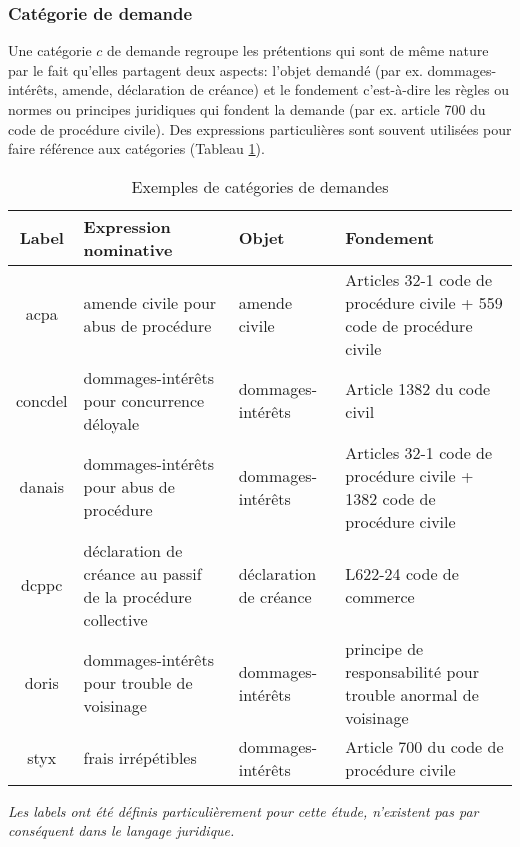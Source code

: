 \subsubsection{Catégorie de demande}

Une catégorie $c$ de demande regroupe les prétentions qui sont de même nature par le fait qu'elles partagent deux aspects: l'objet demandé (par ex. dommages-intérêts, amende, déclaration de créance) et le fondement c'est-à-dire les règles ou normes ou principes juridiques qui fondent la demande (par ex. article 700 du code de procédure civile). Des expressions particulières sont souvent utilisées pour faire référence aux catégories (Tableau \ref{tab:quanta:exemple-categorie}).

\begin{table}[h!]
\scriptsize
\begin{tabular}{|c|p{}|p{}|p{}|}
\hline
\textbf{Label} & \textbf{Expression nominative }                                     & \textbf{Objet}                                                       & \textbf{Fondement}                                                                 \\ \hline
acpa & amende civile pour abus de procédure                         & amende civile                                               & Articles 32-1 code de procédure civile + 559 code de procédure civile  \\ \hline
concdel & dommages-intérêts pour concurrence déloyale                  & dommages-intérêts                                           & Article 1382 du code civil                                             \\ \hline
danais & dommages-intérêts pour abus de procédure                   & dommages-intérêts                                           & Articles 32-1 code de procédure civile + 1382 code de procédure civile \\ \hline
dcppc & déclaration de créance au passif de la procédure collective  & déclaration de créance & L622-24 code de commerce                                               \\ \hline
doris & dommages-intérêts pour trouble de voisinage                  & dommages-intérêts                                           & principe de responsabilité pour trouble anormal de voisinage           \\ \hline
styx & frais irrépétibles                                          & dommages-intérêts                                           & Article 700 du code de procédure civile                                 \\ \hline
\end{tabular}
\textit{Les labels ont été définis particulièrement pour cette étude, n'existent pas par conséquent dans le langage juridique.}
\caption{Exemples de catégories de demandes}\label{tab:quanta:exemple-categorie}
\end{table}

